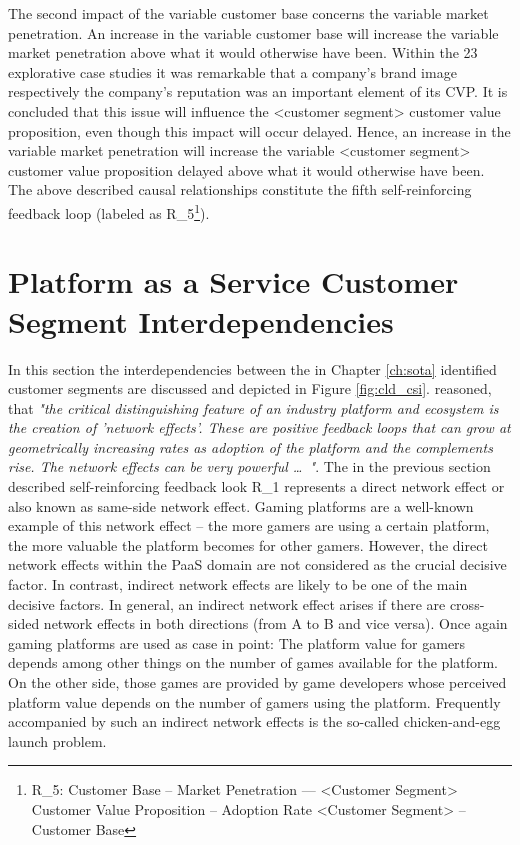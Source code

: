 The second impact of the variable customer base concerns the variable market penetration. An increase in the variable customer base will increase the variable market penetration above what it would otherwise have been. Within the 23 explorative case studies it was remarkable that a company's brand image respectively the company's reputation was an important element of its \ac{CVP}. It is concluded that this issue will influence the <customer segment> customer value proposition, even though this impact will occur delayed. Hence, an increase in the variable market penetration will increase the variable <customer segment> customer value proposition delayed above what it would otherwise have been. The above described causal relationships constitute the fifth self-reinforcing feedback loop (labeled as R\_5\footnote{R\_5: Customer Base -- Market Penetration --- <Customer Segment> Customer Value Proposition -- Adoption Rate <Customer Segment> -- Customer Base}).

\section{Platform as a Service Customer Segment Interdependencies}\label{ch:cld:csi}

In this section the interdependencies between the in Chapter \ref{ch:sota} identified customer segments are discussed and depicted in Figure \ref{fig:cld_csi}. \citet[p. 33]{Cusumano2010} reasoned, that \textit{"the critical distinguishing feature of an industry platform and ecosystem is the creation of 'network effects'. These are positive feedback loops that can grow at geometrically increasing rates as adoption of the platform and the complements rise. The network effects can be very powerful \ldots~"}. The in the previous section described self-reinforcing feedback look R\_1 represents a direct network effect or also known as same-side network effect. Gaming platforms are a well-known example of this network effect -- the more gamers are using a certain platform, the more valuable the platform becomes for other gamers. However, the direct network effects within the \ac{PaaS} domain are not considered as the crucial decisive factor. In contrast, indirect network effects are likely to be one of the main decisive factors. In general, an indirect network effect arises if there are cross-sided network effects in both directions (from A to B and vice versa). Once again gaming platforms are used as case in point: The platform value for gamers depends among other things on the number of games available for the platform. On the other side, those games are provided by game developers whose perceived platform value depends on the number of gamers using the platform. Frequently accompanied by such an indirect network effects is the so-called chicken-and-egg launch problem. 

